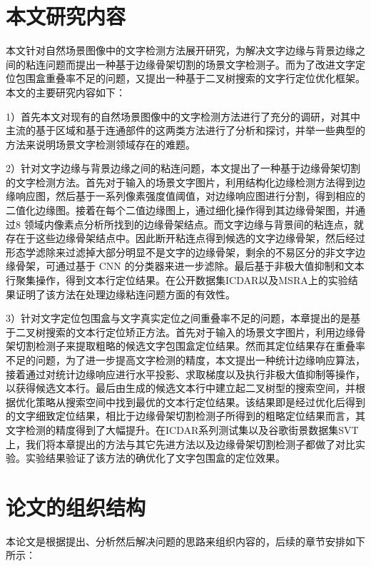     \section{本文研究内容}

    本文针对自然场景图像中的文字检测方法展开研究，为解决文字边缘与背景边缘之间的粘连问题而提出一种基于边缘骨架切割的场景文字检测子。而为了改进文字定位包围盒重叠率不足的问题，又提出一种基于二叉树搜索的文字行定位优化框架。本文的主要研究内容如下：

    1）首先本文对现有的自然场景图像中的文字检测方法进行了充分的调研，对其中主流的基于区域和基于连通部件的这两类方法进行了分析和探讨，并举一些典型的方法来说明场景文字检测领域存在的难题。

    2）针对文字边缘与背景边缘之间的粘连问题，本文提出了一种基于边缘骨架切割的文字检测方法。首先对于输入的场景文字图片，利用结构化边缘检测方法得到边缘响应图，然后基于一系列像素强度值阈值，对边缘响应图进行分割，得到相应的二值化边缘图。接着在每个二值边缘图上，通过细化操作得到其边缘骨架图，并通过8 领域内像素点分析所找到的边缘骨架结点。而文字边缘与背景间的粘连点，就存在于这些边缘骨架结点中。因此断开粘连点得到候选的文字边缘骨架，然后经过形态学滤除来过滤掉大部分明显不是文字的边缘骨架，剩余的不易区分的非文字边缘骨架，可通过基于 CNN 的分类器来进一步滤除。最后基于非极大值抑制和文本行聚集操作，得到文本行定位结果。在公开数据集ICDAR以及MSRA上的实验结果证明了该方法在处理边缘粘连问题方面的有效性。

    3）针对文字定位包围盒与文字真实定位之间重叠率不足的问题，本章提出的是基于二叉树搜索的文本行定位矫正方法。首先对于输入的场景文字图片，利用边缘骨架切割检测子来提取粗略的候选文字包围盒定位结果。然而其定位结果存在重叠率不足的问题，为了进一步提高文字检测的精度，本文提出一种统计边缘响应算法，接着通过对统计边缘响应进行水平投影、求取梯度以及执行非极大值抑制等操作，以获得候选文本行。最后由生成的候选文本行中建立起二叉树型的搜索空间，并根据优化策略从搜索空间中找到最优的文本行定位结果。该结果即是经过优化后得到的文字细致定位结果，相比于边缘骨架切割检测子所得到的粗略定位结果而言，其文字检测的精度得到了大幅提升。在ICDAR系列测试集以及谷歌街景数据集SVT 上，我们将本章提出的方法与其它先进方法以及边缘骨架切割检测子都做了对比实验。实验结果验证了该方法的确优化了文字包围盒的定位效果。

    \section{论文的组织结构}

    本论文是根据提出、分析然后解决问题的思路来组织内容的，后续的章节安排如下所示：

